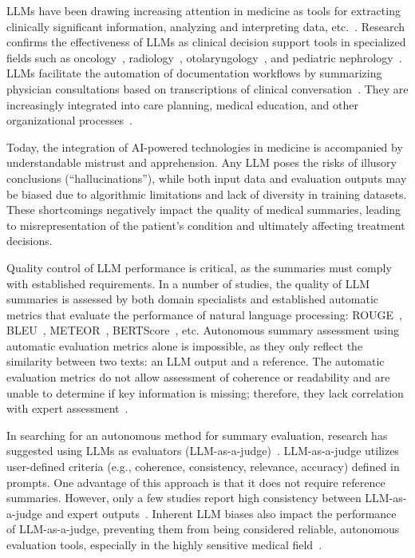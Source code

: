 \documentclass[runningheads]{llncs}
\begin{document}
LLMs have been drawing increasing attention in medicine as tools for extracting clinically significant information, analyzing and interpreting data, etc.~\cite{nazi2024,vasilev2025scoping}. Research confirms the effectiveness of LLMs as clinical decision support tools in specialized fields such as oncology~\cite{kaiser2025}, radiology~\cite{nakaura2024}, otolaryngology~\cite{filali2025}, and pediatric nephrology~\cite{niel2025}. LLMs facilitate the automation of documentation workflows by summarizing physician consultations based on transcriptions of clinical conversation~\cite{lee2023}. They are increasingly integrated into care planning, medical education, and other organizational processes~\cite{liu2025}.

Today, the integration of AI-powered technologies in medicine is accompanied by understandable mistrust and apprehension. Any LLM poses the risks of illusory conclusions (``hallucinations''), while both input data and evaluation outputs may be biased due to algorithmic limitations and lack of diversity in training datasets. These shortcomings negatively impact the quality of medical summaries, leading to misrepresentation of the patient's condition and ultimately affecting treatment decisions.

Quality control of LLM performance is critical, as the summaries must comply with established requirements. In a number of studies, the quality of LLM summaries is assessed by both domain specialists and established automatic metrics that evaluate the performance of natural language processing: ROUGE~\cite{lin2004}, BLEU~\cite{papineni2002}, METEOR~\cite{lavie2007}, BERTScore~\cite{zhang2019}, etc. Autonomous summary assessment using automatic evaluation metrics alone is impossible, as they only reflect the similarity between two texts: an LLM output and a reference. The automatic evaluation metrics do not allow assessment of coherence or readability and are unable to determine if key information is missing; therefore, they lack correlation with expert assessment~\cite{vanveen2024,tang2023}.

In searching for an autonomous method for summary evaluation, research has suggested using LLMs as evaluators (LLM-as-a-judge)~\cite{zheng2023}. LLM-as-a-judge utilizes user-defined criteria (e.g., coherence, consistency, relevance, accuracy) defined in prompts. One advantage of this approach is that it does not require reference summaries. However, only a few studies report high consistency between LLM-as-a-judge and expert outputs~\cite{chen2024,croxford2025}. Inherent LLM biases also impact the performance of LLM-as-a-judge, preventing them from being considered reliable, autonomous evaluation tools, especially in the highly sensitive medical field~\cite{vanschaik2024,gu2024}.
\end{document}

